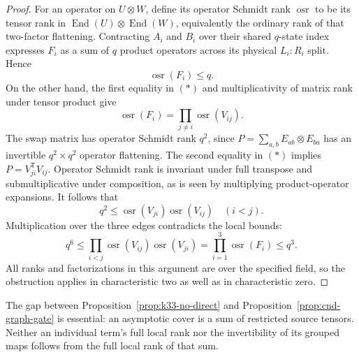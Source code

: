 \begin{proof}
For an operator on $U\otimes W$, define its operator Schmidt rank
$\operatorname{osr}$ to be its tensor rank in
$\operatorname{End}(U)\otimes\operatorname{End}(W)$, equivalently
the ordinary rank of that two-factor flattening.  Contracting
$A_i$ and $B_i$ over their shared $q$-state index expresses
$F_i$ as a sum of $q$ product operators across its physical
$L_i:R_i$ split.  Hence
\[
 \operatorname{osr}(F_i)\le q.
\]
On the other hand, the first equality in $(*)$ and multiplicativity
of matrix rank under tensor product give
\[
 \operatorname{osr}(F_i)=\prod_{j\ne i}
 \operatorname{osr}(V_{ij}).
\]
The swap matrix has operator Schmidt rank $q^2$, since
$P=\sum_{a,b}E_{ab}\otimes E_{ba}$ has an invertible
$q^2\times q^2$ operator flattening.  The second equality in
$(*)$ implies $P=V_{ji}^{\mathsf T}V_{ij}$.  Operator Schmidt
rank is invariant under full transpose and submultiplicative
under composition, as is seen by multiplying product-operator
expansions.  It follows that
\[
 q^2\le \operatorname{osr}(V_{ji})\operatorname{osr}(V_{ij})
 \quad(i<j).
\]
Multiplication over the three edges contradicts the local bounds:
\[
 q^6\le\prod_{i<j}
 \operatorname{osr}(V_{ij})\operatorname{osr}(V_{ji})
 =\prod_{i=1}^3\operatorname{osr}(F_i)\le q^3.
\]
All ranks and factorizations in this argument are over the
specified field, so the obstruction applies in characteristic two
as well as in characteristic zero.
\end{proof}

The gap between Proposition~\ref{prop:k33-no-direct} and
Proposition~\ref{prop:cnd-graph-gate} is essential: an asymptotic
cover is a sum of restricted source tensors.  Neither an individual
term's full local rank nor the invertibility of its grouped maps
follows from the full local rank of that sum.

